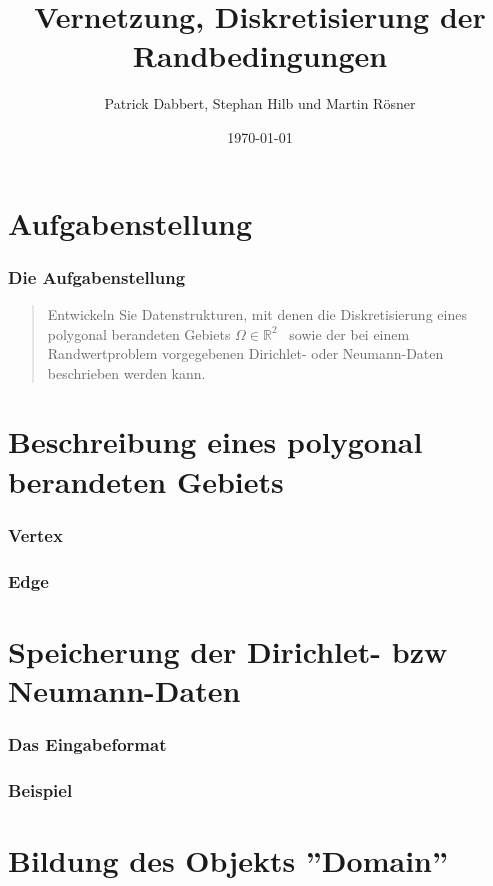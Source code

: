 \documentclass{beamer}
\title{Vernetzung, Diskretisierung der Randbedingungen}
\author{Patrick Dabbert, Stephan Hilb und Martin R\"osner}
\date{\today}
\begin{document}
\begin{frame}
	\titlepage
\end{frame}


\section{Aufgabenstellung}

\begin{frame}
	\frametitle{Die Aufgabenstellung}
	\begin{quote}
		Entwickeln Sie Datenstrukturen, mit denen die Diskretisierung eines polygonal berandeten Gebiets $\Omega \in \mathbb{R}^{2}$ \ sowie der bei einem Randwertproblem vorgegebenen Dirichlet- oder Neumann-Daten beschrieben werden kann.
	\end{quote}
\end{frame}


\section{Beschreibung eines polygonal berandeten Gebiets}

\begin{frame}
	\frametitle{Vertex}
	
\end{frame}

\begin{frame}
	\frametitle{Edge}
	
\end{frame}


\section{Speicherung der Dirichlet- bzw Neumann-Daten}

\begin{frame}[fragile]
	\frametitle{Das Eingabeformat}
	

\end{frame}

\begin{frame}[fragile]
	\frametitle{Beispiel}
	
\end{frame}


\section{Bildung des Objekts ''Domain''}
\end{document}
